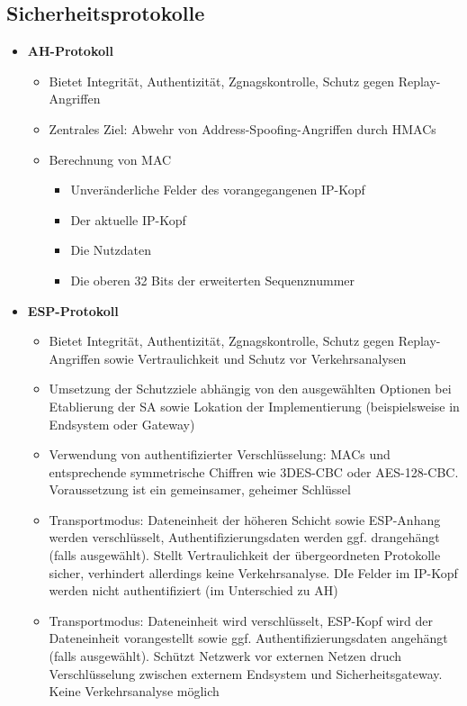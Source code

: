 \subsection{Sicherheitsprotokolle}
\begin{itemize}
	\item \textbf{AH-Protokoll}
	\begin{itemize}
		\item Bietet Integrität, Authentizität, Zgnagskontrolle, Schutz gegen Replay-Angriffen
		\item Zentrales Ziel: Abwehr von Address-Spoofing-Angriffen durch HMACs
		\item Berechnung von MAC
		\begin{itemize}
			\item Unveränderliche Felder des vorangegangenen IP-Kopf
			\item Der aktuelle IP-Kopf
			\item Die Nutzdaten
			\item Die oberen 32 Bits der erweiterten Sequenznummer
		\end{itemize}
	\end{itemize}
	\item \textbf{ESP-Protokoll}
	\begin{itemize}
		\item Bietet Integrität, Authentizität, Zgnagskontrolle, Schutz gegen Replay-Angriffen sowie Vertraulichkeit und Schutz vor Verkehrsanalysen
		\item Umsetzung der Schutzziele abhängig von den ausgewählten Optionen bei Etablierung der SA sowie Lokation der Implementierung (beispielsweise in Endsystem oder Gateway)
		\item Verwendung von authentifizierter Verschlüsselung: MACs und entsprechende symmetrische Chiffren wie 3DES-CBC oder AES-128-CBC. Voraussetzung ist ein gemeinsamer, geheimer Schlüssel
		\item Transportmodus: Dateneinheit der höheren Schicht sowie ESP-Anhang werden verschlüsselt, Authentifizierungsdaten werden ggf. drangehängt (falls ausgewählt). Stellt Vertraulichkeit der übergeordneten Protokolle sicher, verhindert allerdings keine Verkehrsanalyse. DIe Felder im IP-Kopf werden nicht authentifiziert (im Unterschied zu AH)
		\item Transportmodus: Dateneinheit wird verschlüsselt, ESP-Kopf wird der Dateneinheit vorangestellt sowie ggf. Authentifizierungsdaten angehängt (falls ausgewählt). Schützt Netzwerk vor externen Netzen druch Verschlüsselung zwischen externem Endsystem und Sicherheitsgateway. Keine Verkehrsanalyse möglich

\end{itemize}
\end{itemize}
